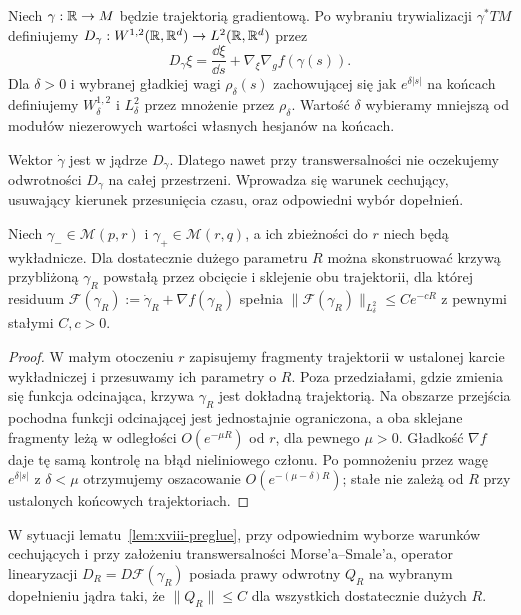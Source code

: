 \begin{definicja}
Niech $\gamma:\mathbb{R}\to M$ będzie trajektorią gradientową.
Po wybraniu trywializacji $\gamma^*TM$ definiujemy
$D_\gamma:W^{1,2}(\mathbb{R},\mathbb{R}^d)\to L^2(\mathbb{R},\mathbb{R}^d)$ przez
\[
D_\gamma\xi=\frac{\dd\xi}{\dd s}
+\nabla_\xi\nabla_g f(\gamma(s)).
\]
Dla $\delta>0$ i wybranej gładkiej wagi
$\rho_\delta(s)$ zachowującej się jak
$e^{\delta|s|}$ na końcach definiujemy
$W^{1,2}_\delta$ i $L^2_\delta$ przez mnożenie przez
$\rho_\delta$. Wartość $\delta$ wybieramy mniejszą od
modułów niezerowych wartości własnych hesjanów na końcach.
\end{definicja}
\begin{uwaga}
Wektor $\dot\gamma$ jest w jądrze $D_\gamma$.
Dlatego nawet przy transwersalności nie oczekujemy
odwrotności $D_\gamma$ na całej przestrzeni.
Wprowadza się warunek cechujący, usuwający kierunek
przesunięcia czasu, oraz odpowiedni wybór dopełnień.
\end{uwaga}
\begin{lemat}
\label{lem:xviii-preglue}
Niech $\gamma_-\in\mathcal M(p,r)$ i
$\gamma_+\in\mathcal M(r,q)$, a ich zbieżności do $r$
niech będą wykładnicze. Dla dostatecznie dużego parametru
$R$ można skonstruować krzywą przybliżoną $\gamma_R$
powstałą przez obcięcie i sklejenie obu trajektorii,
dla której residuum
$\mathcal F(\gamma_R):=\dot\gamma_R+\nabla f(\gamma_R)$
spełnia $\|\mathcal F(\gamma_R)\|_{L^2_\delta}
\le C e^{-cR}$ z pewnymi stałymi $C,c>0$.
\end{lemat}
\begin{proof}
W małym otoczeniu $r$ zapisujemy fragmenty trajektorii
w ustalonej karcie wykładniczej i przesuwamy ich parametry
o $R$. Poza przedziałami, gdzie zmienia się funkcja
odcinająca, krzywa $\gamma_R$ jest dokładną trajektorią.
Na obszarze przejścia pochodna funkcji odcinającej jest
jednostajnie ograniczona, a oba sklejane fragmenty
leżą w odległości $O(e^{-\mu R})$ od $r$, dla pewnego
$\mu>0$. Gładkość $\nabla f$ daje tę samą kontrolę
na błąd nieliniowego członu. Po pomnożeniu przez
wagę $e^{\delta|s|}$ z $\delta<\mu$ otrzymujemy
oszacowanie $O(e^{-(\mu-\delta)R})$; stałe nie zależą
od $R$ przy ustalonych końcowych trajektoriach.
\end{proof}
\begin{lemat}
\label{lem:xviii-uniform-right-inverse}
W sytuacji lematu~\ref{lem:xviii-preglue}, przy odpowiednim
wyborze warunków cechujących i przy założeniu
transwersalności Morse'a--Smale'a, operator linearyzacji
$D_R=D\mathcal F(\gamma_R)$ posiada prawy odwrotny
$Q_R$ na wybranym dopełnieniu jądra taki, że
$\|Q_R\|\le C$ dla wszystkich dostatecznie dużych $R$.
\end{lemat}

